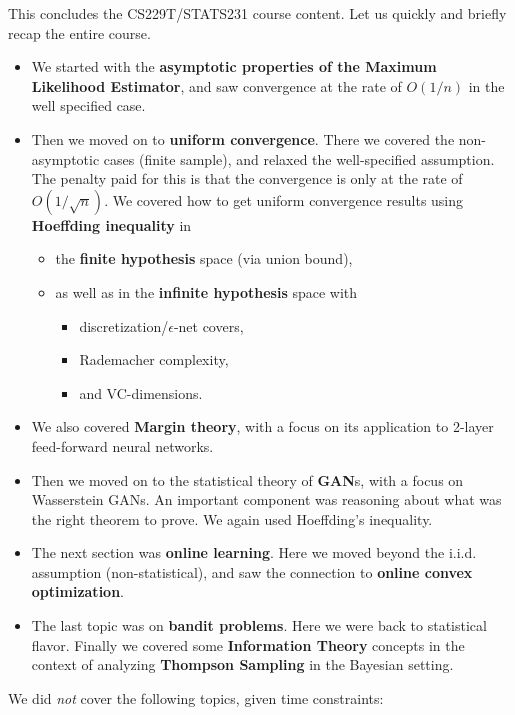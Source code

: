 \documentclass[11pt]{article}
\begin{document}
This concludes the CS229T/STATS231 course content. Let us quickly and briefly recap the entire course.
\begin{itemize}
    \item We started with the \textbf{asymptotic properties of the Maximum Likelihood Estimator}, and saw convergence at the rate of $O(1/n)$ in the well specified case. 
    \item Then we moved on to \textbf{uniform convergence}. There we covered the non-asymptotic cases (finite sample), and relaxed the well-specified assumption. The penalty paid for this is that the convergence is only at the rate of $O(1/\sqrt{n})$. We covered how to get uniform convergence results using \textbf{Hoeffding inequality} in
    \begin{itemize}
        \item the \textbf{finite hypothesis} space (via union bound),
        \item as well as in the \textbf{infinite hypothesis} space with \begin{itemize}
            \item  discretization/$\epsilon$-net covers,
            \item Rademacher complexity,
            \item and VC-dimensions.
        \end{itemize}
    \end{itemize}
     \item We also covered \textbf{Margin theory}, with a focus on its application to 2-layer feed-forward neural networks.
     \item Then we moved on to the statistical theory of \textbf{GAN}s, with a focus on Wasserstein GANs. An important component was reasoning about what was the right theorem to prove. We again used Hoeffding's inequality.
     \item The next section was \textbf{online learning}. Here we moved beyond the i.i.d. assumption (non-statistical), and saw the connection to \textbf{online convex optimization}.
     \item The last topic was on \textbf{bandit problems}. Here we were back to statistical flavor. Finally we covered some \textbf{Information Theory} concepts in the context of analyzing \textbf{Thompson Sampling} in the Bayesian setting.
\end{itemize}

We did \emph{not} cover the following topics, given time constraints:
\end{document}
